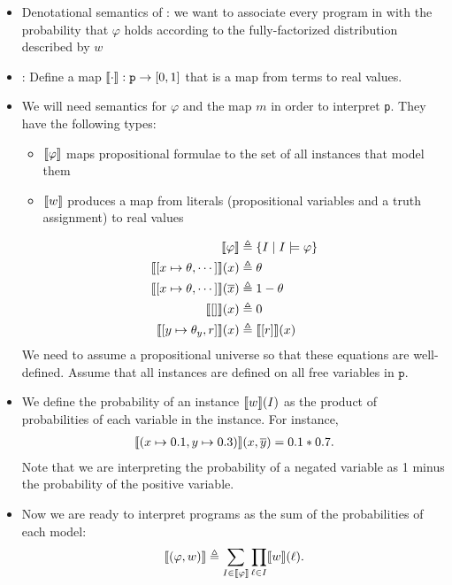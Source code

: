 \documentclass{tufte-handout}
\begin{document}
\begin{itemize}
  \item Denotational semantics of \prop{}: we want to associate every program in
  \prop{} with the probability that $\varphi$ holds according to the fully-factorized distribution 
  described by $w$
  \item {}: Define a map $\llbracket {\cdot} \rrbracket : \texttt{p} \rightarrow [0,1]$ that is a map from 
  \prop{} terms to real values. 
  \item We will need semantics for $\varphi$ and the map $m$ in order to
  interpret \texttt{p}. 
  They have the following types:
  \begin{itemize}
    \item $\llbracket {\varphi} \rrbracket$ maps propositional formulae to the set of all instances that model them
    \item $\llbracket {w} \rrbracket$ produces a map from literals (propositional variables 
    and a truth assignment) to real values
  \end{itemize}
  \begin{align}
    \llbracket {\varphi} \rrbracket &\triangleq \{I \mid I \models \varphi\}\\
    \llbracket {[x \mapsto \theta, \cdots]} \rrbracket(x) &\triangleq \theta\\
    \llbracket {[x \mapsto \theta, \cdots]} \rrbracket(\overline{x}) &\triangleq 1-\theta\\
    \llbracket {[]} \rrbracket(x) &\triangleq 0 \\
    \llbracket {[y \mapsto \theta_y, r]} \rrbracket(x) &\triangleq \llbracket {[r]} \rrbracket(x)
  \end{align}
  We need to assume a propositional universe so that these equations are well-defined.
  Assume that all instances are defined on all free variables in $\texttt{p}$.
  \item We define the probability of an instance $\llbracket {w} \rrbracket(I)$ as the product of probabilities 
  of each variable in the instance. For instance,
  \begin{align*}
    \llbracket {(x \mapsto 0.1, y \mapsto 0.3)} \rrbracket(x, \overline{y}) = 
    0.1 * 0.7.
  \end{align*}
  Note that we are interpreting the probability of a negated variable as 
  1 minus the probability of the positive variable.
  \item Now we are ready to interpret \prop{} programs as the sum of the probabilities 
  of each model:
  \begin{align}
    \llbracket {(\varphi, w)} \rrbracket \triangleq \sum_{I \in \llbracket {\varphi} \rrbracket} \prod_{\ell \in I} \llbracket {w} \rrbracket(\ell).
  \end{align}

\end{itemize}
\end{document}
